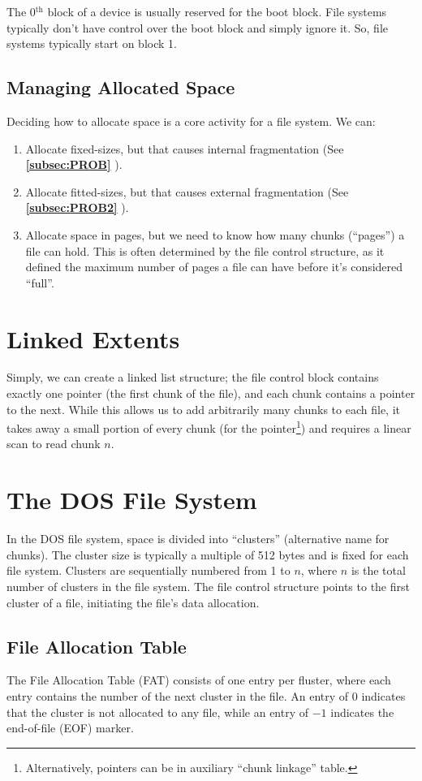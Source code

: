 \documentclass{report}
\newcommand{\refto}[2]{\textbf{\ref{#1:#2} \nameref{#1:#2}}}
\begin{document}
The 0$^\text{th}$ block of a device is usually reserved for the boot block. File systems typically don't
have control over the boot block and simply ignore it. So, file systems typically start on block 1.


\subsection{Managing Allocated Space}
Deciding how to allocate space is a core activity for a file system. We can:

\begin{enumerate}[label=\textit{(\roman*)}]
\item Allocate fixed-sizes, but that causes internal fragmentation (See \refto{subsec}{PROB}).
\item Allocate fitted-sizes, but that causes external fragmentation (See \refto{subsec}{PROB2}).
\item Allocate space in pages, but we need to know how many chunks (``pages'') a file can hold. This
  is often determined by the file control structure, as it defined the maximum number of pages a
  file can have before it's considered ``full''.
\end{enumerate}


\section{Linked Extents}
Simply, we can create a linked list structure; the file control block contains exactly one pointer
(the first chunk of the file), and each chunk contains a pointer to the next. While this allows us to add
arbitrarily many chunks to each file, it takes away a small portion of every chunk (for the
pointer\footnote{Alternatively, pointers can be in auxiliary ``chunk linkage'' table.})  and
requires a linear scan to read chunk $n$.


\section{The DOS File System}
In the DOS file system, space is divided into ``clusters'' (alternative name for chunks). The
cluster size is typically a multiple of 512 bytes and is fixed for each file system. Clusters are
sequentially numbered from 1 to $n$, where $n$ is the total number of clusters in the file
system. The file control structure points to the first cluster of a file, initiating the file's data
allocation.


\subsection{File Allocation Table}
The File Allocation Table (FAT) consists of one entry per fluster, where each entry contains the
number of the next cluster in the file. An entry of 0 indicates that the cluster is not allocated to
any file, while an entry of $-1$ indicates the end-of-file (EOF) marker.
\end{document}

